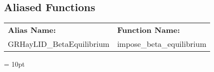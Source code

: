 \documentclass{article}
\begin{document}
\subsection*{Aliased Functions}

\hspace{5mm}

 \begin{tabular*}{160mm}{ll} 

{\bf Alias Name:} ~~~~~~~ & {\bf Function Name:} \\ 
GRHayLID\_BetaEquilibrium & impose\_beta\_equilibrium \\ 
\end{tabular*} 



\vspace{5mm}\parskip = 10pt 
\end{document}
